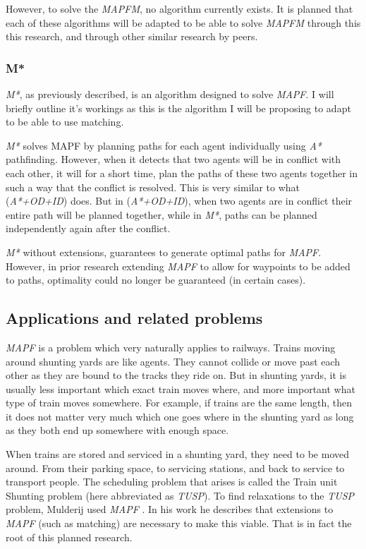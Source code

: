 \documentclass[english]{article}
\begin{document}
However, to solve the \textit{MAPFM}, no algorithm currently exists. It is planned that each of these algorithms will be adapted to be able to solve \textit{MAPFM} through this this research, and through other similar research by peers.

\subsubsection*{M*}

\textit{M*}, as previously described, is an algorithm designed to solve \textit{MAPF}. I will briefly outline it's workings as this is the algorithm I will be proposing to adapt to be able to use matching.

\textit{M*} solves MAPF by planning paths for each agent individually using \textit{A*} pathfinding. However, when it detects that two agents will be in conflict with each other, it will for a short time, plan the paths of these two agents together in such a way that the conflict is resolved. This is very similar to what (\textit{A*+OD+ID}) does. But in (\textit{A*+OD+ID}), when two agents are in conflict their entire path will be planned together, while in \textit{M*}, paths can be planned independently again after the conflict.

\textit{M*} without extensions, guarantees to generate optimal paths for \textit{MAPF}. However, in prior research extending \textit{MAPF} to allow for waypoints to be added to  paths, optimality could no longer be guaranteed (in certain cases). \cite{MSTAR_waypoints_van_dijk_2020}

\subsection{Applications and related problems}

\textit{MAPF} is a problem which very naturally applies to railways. Trains moving around shunting yards are like agents. They cannot collide or move past each other as they are bound to the tracks they ride on. But in shunting yards, it is usually less important which exact train moves where, and more important what type of train moves somewhere. For example, if trains are the same length, then it does not matter very much which one goes where in the shunting yard as long as they both end up somewhere with enough space.

When trains are stored and serviced in a shunting yard, they need to be moved around. From their parking space, to servicing stations, and back to service to transport people. The scheduling problem that arises is called the Train unit Shunting problem (here abbreviated as \textit{TUSP}). To find relaxations to the \textit{TUSP} problem, Mulderij used \textit{MAPF} \cite{TUSS_MAPF_mulderij_2020}. In his work he describes that extensions to \textit{MAPF} (such as matching) are necessary to make this viable. That is in fact the root of this planned research.
\end{document}
